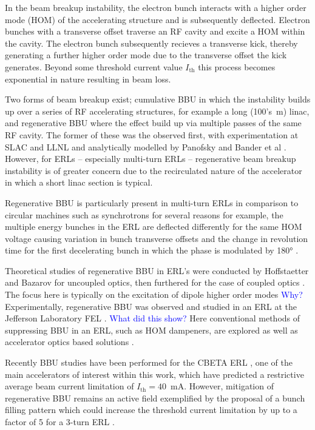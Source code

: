 \documentclass[../main.tex]{subfiles}
\begin{document}
In the beam breakup instability, the electron bunch interacts with a higher order mode (HOM) of the accelerating structure and is subsequently deflected. Electron bunches with a transverse offset traverse an RF cavity and excite a HOM within the cavity. The electron bunch subsequently recieves a transverse kick, thereby generating a further higher order mode due to the transverse offset the kick generates. Beyond some threshold current value $I_{\mathrm{th}}$ this process becomes exponential in nature resulting in beam loss.

Two forms of beam breakup exist; cumulative BBU in which the instability builds up over a series of RF accelerating structures, for example a long (100's~\si{\meter}) linac, and regenerative BBU where the effect build up via multiple passes of the same RF cavity. The former of these was the observed first, with experimentation at SLAC \cite{panofsky1966electrons,altenmueller1966beam} and LLNL \cite{neil1970coherent} and analytically modelled by Panofsky and Bander et al \cite{panofsky1968asymptotic}. However, for ERLs -- especially multi-turn ERLs -- regenerative beam breakup instability is of greater concern due to the recirculated nature of the accelerator in which a short linac section is typical.

Regenerative BBU is particularly present in multi-turn ERLs in comparison to circular machines such as synchrotrons for several reasons for example, the multiple energy bunches in the ERL are deflected differently for the same HOM voltage causing variation in bunch transverse offsets and the change in revolution time for the first decelerating bunch in which the phase is modulated by 180\si{\degree} \cite{setiniyaz2021filling}.

Theoretical studies of regenerative BBU in ERL's were conducted by Hoffstaetter and Bazarov \cite{hoffstaetter2004beam} for uncoupled optics, then furthered for the case of coupled optics \cite{hoffstaetter2007recirculating}. The focus here is typically on the excitation of dipole higher order modes \textcolor{blue}{Why?} Experimentally, regenerative BBU was observed and studied in an ERL at the Jefferson Laboratory FEL \cite{tennant2005first,douglas2006experimental}. \textcolor{blue}{What did this show?} Here conventional methods of suppressing BBU \cite{tennant2004methods} in an ERL, such as HOM dampeners, are explored as well as accelerator optics based solutions \cite{rand1980beam}. 

Recently BBU studies have been performed for the CBETA ERL \cite{lou2019beam}, one of the main accelerators of interest within this work, which have predicted a restrictive average beam current limitation of $I_{\mathrm{th}} = 40$~\si{\milli\ampere}. However, mitigation of regenerative BBU remains an active field exemplified by the proposal of a bunch filling pattern which could increase the threshold current limitation by up to a factor of 5 for a 3-turn ERL \cite{setiniyaz2021filling}.    
\end{document}
